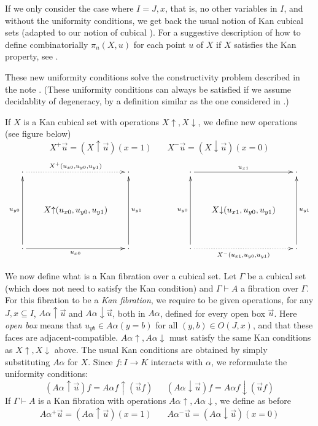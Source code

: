 \documentclass[10pt,a4paper]{article}
\newcommand{\rup}[1]{#1{\uparrow}}
\newcommand{\rdo}[1]{#1{\downarrow}}
\begin{document}
If we only consider the case where $I = J,x$, that is, no other
variables in $I$, and without the uniformity conditions, we get back
the usual notion of Kan cubical sets \cite[Section 4]{Kan} (adapted to
our notion of cubical ).  For a suggestive description of how to
define combinatorially $\pi_n(X,u)$ for each point $u$ of $X$ if $X$
satisfies the Kan property, see \cite{Williamson}.

 These new uniformity conditions solve the constructivity problem described in the note \cite{BC}.
(These uniformity conditions can always be satisfied if we assume decidablity of degeneracy, by a definition similar
as the one considered in \cite{BCH}.)

If $X$ is a Kan cubical set with operations $\rup{X},\rdo{X}$, we define new operations (see figure below)
$$
X^+\vec u = (\rup{X} \vec u)(x=1)~~~~~~~~X^-\vec u = (\rdo{X} \vec u)(x=0)$$
\def\noe{\cdot}
\[
\xymatrix@R=1.1cm@C=.6cm{
\noe\ar@{.>}[rr]^{X^+(u_{x0}, u_{y0},u_{y1})}&      & \noe                                     &&&
\noe\ar[rr]^{u_{x1}}                                 &      & \noe      \\
                                      &\rup{X}(u_{x0}, u_{y0},u_{y1})&                          &&&
                                      &\rdo{X}(u_{x1}, u_{y0},u_{y1})&                              \\
\noe\ar[rr]_{u_{x0}}\ar[uu]^{u_{y0}}&      & \noe\ar[uu]_{u_{y1}}                                     &&&
\noe\ar@{.>}[rr]_{X^-(u_{x1}, u_{y0},u_{y1})}\ar[uu]^{u_{y0}}     &      & \noe\ar[uu]_{u_{y1}}                       \\
}
\]

 We now define what is a Kan fibration over a cubical set.
Let $\Gamma$ be a cubical set (which does not need to satisfy the Kan condition)
and $\Gamma\vdash A$ a fibration over $\Gamma$.
For this fibration to be a \emph{Kan fibration}, we require to be given operations,
for any $J,x\subseteq I$,
$\rup{A\alpha} \vec u$  and $\rdo{A\alpha} \vec u$, both in $A\alpha$,
defined for every open box $\vec u$.
Here \emph{open box} means that $u_{yb}\in A\alpha(y=b)$ for all $(y,b)\in O(J,x)$,
and that these faces are adjacent-compatible.
$\rup{A\alpha}, \rdo{A\alpha}$ must satisfy the same Kan conditions as $ \rup{X},\rdo{X}$ above.
The usual Kan conditions are obtained by simply substituting $A\alpha$ for $X$.
Since $f:I\to K$ interacts with $\alpha$, we reformulate the uniformity conditions:
$$
(\rup{A\alpha} \vec u)f = \rup{A\alpha f} (\vec{u}f)~~~~~~~
(\rdo{A\alpha} \vec u)f = \rdo{A\alpha f} (\vec{u}f)
$$
If $\Gamma\vdash A$ is a Kan fibration with operations $\rup{A\alpha},\rdo{A\alpha}$, we define as before
$$
A\alpha^+\vec u = (\rup{A\alpha} \vec u)(x=1)~~~~~~~~
A\alpha^-\vec u = (\rdo{A\alpha} \vec u)(x=0)
$$
\end{document}
